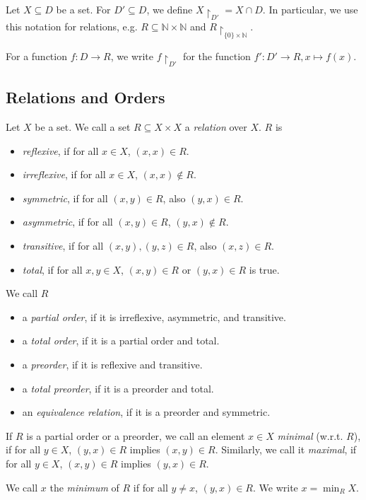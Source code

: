 \begin{defn}
	Let $X \subseteq D$ be a set. For $D' \subseteq D$, we define $X \upharpoonright_{D'} = X \cap D$. In particular, we use this notation for relations, e.g. $R \subseteq \mathbb{N} \times \mathbb{N}$ and $R \upharpoonright_{\{0\} \times \mathbb{N}}$.
	
	For a function $f : D \rightarrow R$, we write $f \upharpoonright_{D'}$ for the function $f' : D' \rightarrow R, x \mapsto f(x)$.
\end{defn}


\subsection{Relations and Orders}
\begin{defn}
	Let $X$ be a set. We call a set $R \subseteq X \times X$ a \emph{relation} over $X$. $R$ is
	\begin{itemize}
		\item \emph{reflexive}, if for all $x \in X$, $(x, x) \in R$.
		\item \emph{irreflexive}, if for all $x \in X$, $(x, x) \notin R$.
		\item \emph{symmetric}, if for all $(x, y) \in R$, also $(y, x) \in R$.
		\item \emph{asymmetric}, if for all $(x, y) \in R$, $(y, x) \notin R$.
		\item \emph{transitive}, if for all $(x, y), (y, z) \in R$, also $(x, z) \in R$.
		\item \emph{total}, if for all $x, y \in X$, $(x, y) \in R$ or $(y, x) \in R$ is true.
	\end{itemize}
	
	We call $R$ 
	\begin{itemize}
		\item a \emph{partial order}, if it is irreflexive, asymmetric, and transitive.
		\item a \emph{total order}, if it is a partial order and total.
		\item a \emph{preorder}, if it is reflexive and transitive.
		\item a \emph{total preorder}, if it is a preorder and total.
		\item an \emph{equivalence relation}, if it is a preorder and symmetric.
	\end{itemize}
	
	If $R$ is a partial order or a preorder, we call an element $x \in X$ \emph{minimal} (w.r.t. $R$), if for all $y \in X$, $(y, x) \in R$ implies $(x, y) \in R$. Similarly, we call it \emph{maximal}, if for all $y \in X$, $(x, y) \in R$ implies $(y, x) \in R$. 
	
	We call $x$ the \emph{minimum} of $R$ if for all $y \neq x$, $(y, x) \in R$. We write $x = \min_R X$.
\end{defn}


